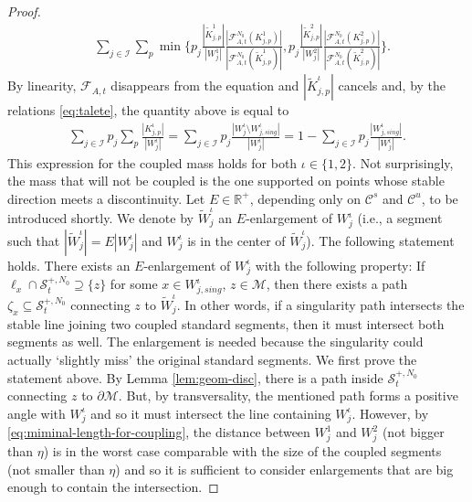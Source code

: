 \documentclass{amsart}
\numberwithin{equation}{section}
\newcommand\cF{{\mathcal F}}
\newcommand\cI{{\mathcal I}}
\newcommand\cM{{\mathcal M}}
\newcommand\cS{{\mathcal S}}
\newcommand\bR{{\mathbb R}}
\newcommand{\catt}{\cF_{A,t}}
\begin{document}
\begin{proof}
\[
\begin{split}
&\sum_{j \in \cI}\sum_{p} \min \biggl\{p_j\frac{|\widetilde K^{1}_{j,p}|}{|W^{1}_j|} \frac{|\catt^{N_0} (K_{j,p}^1)|}{|\catt^{N_0}(\widetilde K_{j,p}^1)|}, p_j \frac{|\widetilde K^{2}_{j,p}|}{|W^{2}_j|} \frac{|\catt^{N_0}(K_{j,p}^2)|}{|\catt^{N_0}(\widetilde K_{j,p}^2)|}\biggr\}.
\end{split}
\]
By linearity, \(\catt\) disappears from the equation and \(|\widetilde K_{j,p}^{\iota}|\) cancels and, by the relations \eqref{eq:talete}, the quantity above is equal to
\[
\begin{split}
 \sum_{j \in \cI} p_j \sum_{p}\frac{ |K_{j,p}^{\iota}|}{|W^{\iota}_j|} =\sum_{j \in \cI} p_{j}\frac{| W^{\iota}_j \setminus W^\iota_{j,sing}|}{|W^{\iota}_j|}
 = 1- \sum_{j \in \cI} p_{j}\frac{| W^\iota_{j,sing}|}{|W^{\iota}_j|}. 
 \end{split}
\]
 This expression for the coupled mass holds for both \(\iota \in\{1,2\}\). Not surprisingly, the mass that will not be coupled is the one supported on points whose stable direction meets a discontinuity. Let \(E \in \bR^+\), depending only on \(\mathscr C^s\) and \(\mathscr C^u\), to be introduced shortly. We denote by \(\widetilde W^{\iota}_{j}\) an \(E\)-enlargement  of \(W^{\iota}_{j}\) (i.e., a segment such that \(|\widetilde W^{\iota}_{j}| = E|W^{\iota}_{j}|\) and \(W^{\iota}_{j}\) is in the center of \(\widetilde W^{\iota}_{j}\)). The following statement holds. There exists an \(E\)-enlargement of \(W^{\iota}_{j}\) with the following property: If \(\ell_x \cap \cS_t^{+, N_0} \supseteq \{z\}\) for some \(x \in W^{\iota}_{j,sing}\), \(z \in \cM\), then there exists a path \(\zeta_x \subseteq  \cS_t^{+, N_0}\) connecting \(z\) to \(\widetilde W^{\iota}_{j}\). In other words, if a singularity path intersects the stable line joining two coupled standard segments, then it must intersect both segments as well. The enlargement is needed because the singularity could actually `slightly miss' the original standard segments. We first prove the statement above. By Lemma \ref{lem:geom-disc}, there is a path inside \(\cS_t^{+, N_0}\) connecting \(z\) to \(\partial \cM\). But, by transversality, the mentioned path forms a positive angle with \(W^{\iota}_j\) and so it must intersect the line containing \(W^{\iota}_j\). However, by \eqref{eq:miminal-length-for-coupling}, the distance between \(W^1_j\) and \(W^2_j\) (not bigger than \(\eta\)) is in the worst case comparable with the size of the coupled segments (not smaller than \(\eta\)) and so it is sufficient to consider enlargements that are big enough to contain the intersection.


\end{proof}
\end{document}
